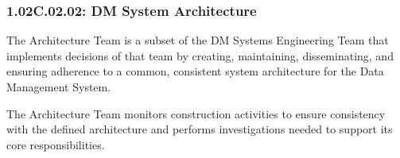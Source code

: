 \subsubsection{1.02C.02.02: DM System Architecture}

The Architecture Team is a subset of the DM Systems Engineering Team that implements decisions of that team by creating, maintaining, disseminating, and ensuring adherence to a common, consistent system architecture for the Data Management System.

The Architecture Team monitors construction activities to ensure consistency with the defined architecture and performs investigations needed to support its core responsibilities.
